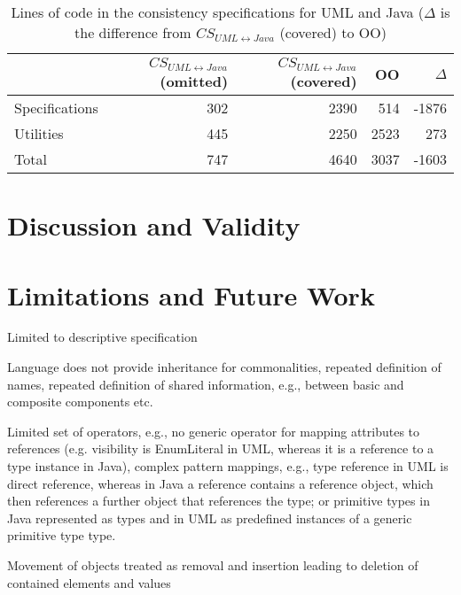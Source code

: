 \begin{table}[htb]
	\centering
		\begin{tabular}{lrrrr}
			\toprule
			\multicolumn{1}{l}{\bfseries } & \multicolumn{1}{r}{$CS_{{UML}\leftrightarrow{Java}}$ (omitted)} & \multicolumn{1}{r}{$CS_{{UML}\leftrightarrow{Java}}$ (covered)} & \multicolumn{1}{r}{OO} & \multicolumn{1}{r}{$\Delta$}\\
			\midrule
			Specifications 			& 302	& 2390 	& 514 	& -1876 \\
			Utilities				& 445	& 2250	& 2523 	& 273 \\
			\midrule
			Total					& 747	& 4640 	& 3037 	& -1603\\
			\bottomrule
		\end{tabular}
	\caption[Lines of code in the consistency specifications for UML and Java]{Lines of code in the consistency specifications for UML and Java ($\Delta$ is the difference from $CS_{{UML}\leftrightarrow{Java}}$ (covered) to OO)}
	\label{tab:commonalities_evaluation:reactions_comparison}
\end{table}



\section{Discussion and Validity}

\section{Limitations and Future Work}
Limited to descriptive specification

Language does not provide inheritance for commonalities, repeated definition of names, repeated definition of shared information, e.g., between basic and composite components etc.

Limited set of operators, e.g., no generic operator for mapping attributes to references (e.g. visibility is EnumLiteral in UML, whereas it is a reference to a type instance in Java), complex pattern mappings, e.g., type reference in UML is direct reference, whereas in Java a reference contains a reference object, which then references a further object that references the type; or primitive types in Java represented as types and in UML as predefined instances of a generic primitive type type.

Movement of objects treated as removal and insertion leading to deletion of contained elements and values


